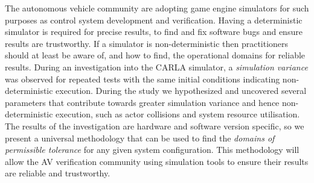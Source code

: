 \documentclass[letterpaper, 10 pt, journal, twoside]{IEEEtran}
\begin{document}

The autonomous vehicle community are adopting game engine simulators for such purposes as control system development and verification. 
%
Having a deterministic simulator is required for precise results, 
%
to find and fix software bugs and ensure results are trustworthy. 
%
If a simulator is non-deterministic then practitioners should at least be aware of, and how to find, the operational domains for reliable results. During an investigation into the CARLA simulator, a \textit{simulation variance} was observed for repeated tests with the same initial conditions indicating non-deterministic execution. 
%
During the study we hypothesized and uncovered several parameters that contribute towards greater simulation variance and hence non-deterministic execution, such as actor collisions and system resource utilisation. 
%
The results of the investigation are hardware and software version specific, so we present a universal methodology that can be used to find the \textit{domains of permissible tolerance} for any given system configuration. 
%
This methodology will allow the AV verification community using simulation tools to ensure their results are reliable and trustworthy.
\end{document}
